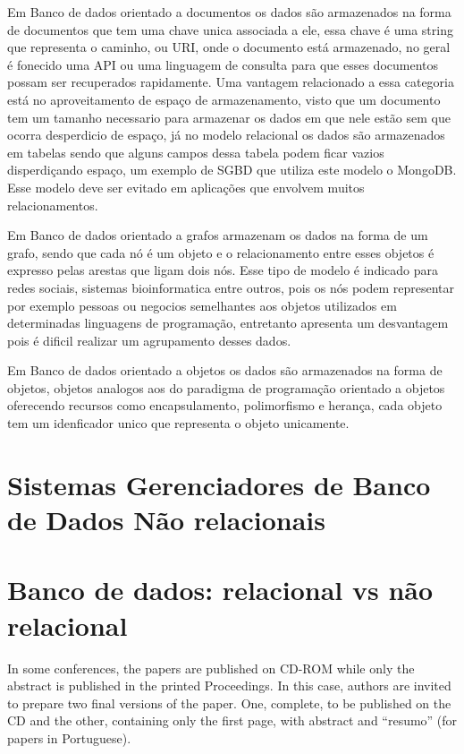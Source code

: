 \documentclass[12pt]{article}
\begin{document}
Em Banco de dados orientado a documentos os dados são armazenados na forma de documentos que tem uma chave unica associada a ele, essa chave é uma string que representa o caminho, ou URI, onde o documento está armazenado, no geral é fonecido uma API ou uma linguagem de consulta para que esses documentos possam ser recuperados rapidamente. \cite{surveyNosql:2012} Uma vantagem relacionado a essa categoria está no aproveitamento de espaço de armazenamento, visto que um documento tem um tamanho necessario para armazenar os dados em que nele estão sem que ocorra desperdicio de espaço, já no modelo relacional os dados são armazenados em tabelas sendo que alguns campos dessa tabela podem ficar vazios disperdiçando espaço, um exemplo de SGBD que utiliza este modelo o MongoDB. Esse modelo deve ser evitado em aplicações que envolvem muitos relacionamentos. \cite{typeNOSQL:2013}

Em Banco de dados orientado a grafos armazenam os dados na forma de um grafo, sendo que cada nó é um objeto e o relacionamento entre esses objetos é expresso pelas arestas que ligam dois nós. Esse tipo de modelo é indicado para redes sociais, sistemas bioinformatica entre outros, pois os nós podem representar por exemplo pessoas ou negocios semelhantes aos objetos utilizados em determinadas linguagens de programação, entretanto apresenta um desvantagem pois é dificil realizar um agrupamento desses dados.\cite{typeNOSQL:2013}\cite{surveyNosql:2012} 

Em Banco de dados orientado a objetos os dados são armazenados na forma de objetos, objetos analogos aos do paradigma de programação orientado a objetos oferecendo recursos como encapsulamento, polimorfismo e herança, cada objeto tem um idenficador unico que representa o objeto unicamente.\cite{typeNOSQL:2013}

\section{Sistemas Gerenciadores de Banco de Dados Não relacionais}

\section{Banco de dados: relacional vs não relacional}

In some conferences, the papers are published on CD-ROM while only the
abstract is published in the printed Proceedings. In this case, authors are
invited to prepare two final versions of the paper. One, complete, to be
published on the CD and the other, containing only the first page, with
abstract and ``resumo'' (for papers in Portuguese).
\end{document}
